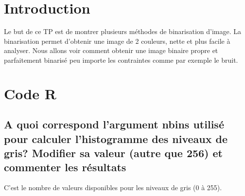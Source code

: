 \documentclass[a4paper,12pt]{report}
\begin{document}


\setcounter{page}{1} 
\newpage

\section*{Introduction}
Le but de ce TP est de montrer plusieurs méthodes de binarisation d'image. La binarisation permet d'obtenir une image de 2 couleurs, nette et plus facile à analyser. Nous allons voir comment obtenir une image binaire propre et parfaitement binarisé peu importe les contraintes comme par exemple le bruit.

\section*{Code R}

\subsection*{A quoi correspond l'argument nbins utilisé pour calculer l'histogramme des niveaux de gris? Modifier sa valeur (autre que 256) et commenter les résultats}

C'est le nombre de valeurs disponibles pour les niveaux de gris (0 à 255).
\end{document}
